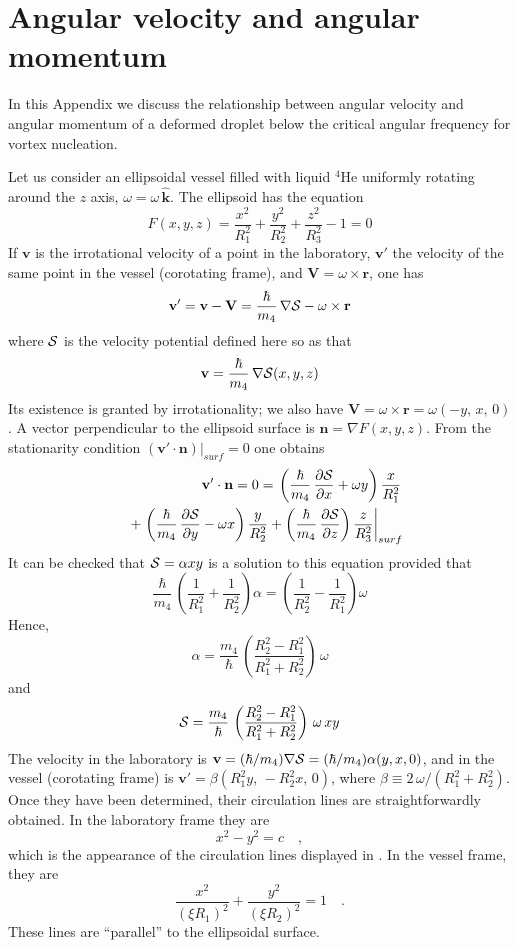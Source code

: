 \chapter{Angular velocity and angular momentum}

In this Appendix we discuss the relationship between angular velocity and angular momentum of a deformed droplet below the critical angular frequency for vortex 
nucleation.

Let us consider an ellipsoidal vessel filled with liquid $^4$He uniformly rotating around the $z$ axis, $\omega = \omega\, \hat{\mathbf{k}}$.
The ellipsoid has the equation
$$ F(x,y,z) =\frac{x^2}{R_1^2}+ \frac{y^2}{R_2^2}+  \frac{z^2}{R_3^2} - 1 = 0$$
%
If $\mathbf{v}$ is the  irrotational velocity of a point in the laboratory, $\mathbf{v}'$ the velocity of the same point in the vessel (corotating frame),  and 
$\mathbf{V}= \omega \times \mathbf{r}$, one has
%
$$\mathbf{v}'=  \mathbf{v} - \mathbf{V} = \frac{\hbar}{m_4} \, \nabla {\cal S} - \omega \times \mathbf{r}$$
%
where ${\cal S}$ is the velocity potential defined here so as  that 
%
$$\mathbf{v}= \frac{\hbar}{m_4} \, \nabla {\cal S}(x,y,z)$$
%
Its existence is granted by irrotationality;  we also have
  $\mathbf{V}= \omega \times \mathbf{r} = \omega (-y,\, x, \,0)$.
A vector  perpendicular to the ellipsoid  surface is 
%
$\mathbf{n} = \nabla  F(x,y,z)$.
%
From the stationarity condition 
%
$( \mathbf{v}'  \cdot  \mathbf{n})|_{surf} =0$
%
one obtains
%
\begin{eqnarray}
&&\mathbf{v}'  \cdot  \mathbf{n}= 0 = \left.\left(\frac{\hbar}{m_4} \, \frac{\partial {\cal S}}{\partial x} + \omega y\right) \frac{x}{R_1^2} \right.
\nonumber
\\
\nonumber
&&
+  \left. \left(\frac{\hbar}{m_4} \,\frac{\partial {\cal S}}{\partial y} - \omega x\right) \frac{y}{R_2^2} 
+  \left(\frac{\hbar}{m_4} \, \frac{\partial {\cal S}}{\partial z} \right) \frac{z}{R_3^2} \right|_{surf}
\end{eqnarray}
%
It can be checked that ${\cal S} = \alpha xy$ is a solution to this equation provided that
%
$$\frac{\hbar}{m_4} \,  \left( \frac{1}{R_1^2}  + \frac{1}{R_2^2} \right)  \alpha = \left(\frac{1}{R_2^2}  - \frac{1}{R_1^2} \right)  \omega$$
%
Hence,
%
$$ \alpha = \frac{m_4}{\hbar}\,\left( \frac{R_2^2-R_1^2}{R_1^2+R_2^2}\right) \, \omega$$
%
and
%
$$ {\cal S} = \frac{m_4}{\hbar} \, \left( \frac{R_2^2-R_1^2}{R_1^2+R_2^2}\right)  \, \omega \, xy$$
%
The velocity in the laboratory is 
$ \mathbf{v} = (\hbar/m_4)\nabla {\cal S}=  (\hbar/m_4)\alpha (y, x, 0) $,
and in the vessel (corotating frame) is
$\mathbf{v}'= \beta (R_1^2 y, \, -R_2 ^2 x, \,0) $, where $\beta \equiv  2 \, \omega/(R_1^2+R_2^2)$.
 Once they have been determined, their  circulation lines are straightforwardly obtained. 
In the laboratory frame they are
$$ x^2 - y^2 = c \quad ,$$
%
which is the appearance of the circulation lines displayed in . In the vessel  frame, they are
%
$$ \frac{x^2}{(\xi R_1)^2}+ \frac{ y^2}{(\xi R_2)^2} = 1 \quad .$$ 
%
These lines are ``parallel'' to the ellipsoidal surface.

